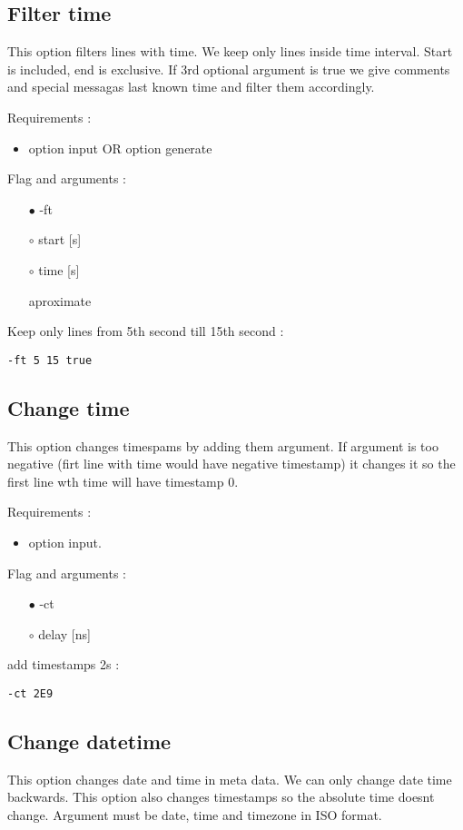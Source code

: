 \documentclass[english]{article}
\begin{document}
\subsection{Filter time}
This option filters lines with time. We keep only lines inside time interval. Start is included, end is exclusive. If 3rd optional argument is true we give comments and special messagas last known time and filter them accordingly. 

\noindent Requirements : 
\begin{itemize}
\item option input OR option generate
\end{itemize}
Flag and arguments :
\begin{itemize}
\item[$\bullet$] -ft
\item[$\circ$] start [s]
\item[$\circ$] time [s]
\item[\textasteriskcentered] aproximate
\end{itemize}
Keep only lines from 5th second till 15th second : 
\begin{lstlisting} 
-ft 5 15 true
\end{lstlisting}


\subsection{Change time}
This option changes timespams by adding them argument. If argument is too negative (firt line with time would have negative timestamp) it changes it so the first line wth time will have timestamp 0. 

\noindent Requirements : 
\begin{itemize}
\item option input. 
\end{itemize}
Flag and arguments :
\begin{itemize}
\item[$\bullet$] -ct
\item[$\circ$] delay [ns]
\end{itemize}
add timestamps 2s : 
\begin{lstlisting} 
-ct 2E9
\end{lstlisting}


\subsection{Change datetime}
This option changes date and time in meta data. We can only change date time backwards. This option also changes timestamps so the absolute time doesnt change. Argument must be date, time and timezone in ISO format. 
\end{document}
